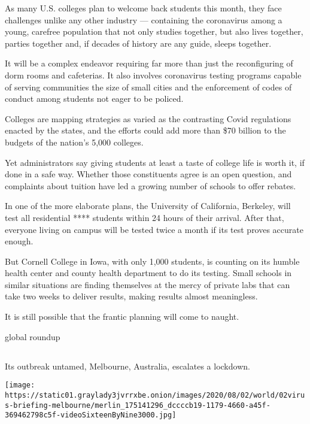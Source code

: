 As many U.S. colleges plan to welcome back students this month, they
face challenges unlike any other industry --- containing the coronavirus
among a young, carefree population that not only studies together, but
also lives together, parties together and, if decades of history are any
guide, sleeps together.

It will be a complex endeavor requiring far more than just the
reconfiguring of dorm rooms and cafeterias. It also involves coronavirus
testing programs capable of serving communities the size of small cities
and the enforcement of codes of conduct among students not eager to be
policed.

Colleges are mapping strategies as varied as the contrasting Covid
regulations enacted by the states, and the efforts could add more than
\$70 billion to the budgets of the nation's 5,000 colleges.

Yet administrators say giving students at least a taste of college life
is worth it, if done in a safe way. Whether those constituents agree is
an open question, and complaints about tuition have led a growing number
of schools to offer rebates.

In one of the more elaborate plans, the University of California,
Berkeley, will test all residential **** students within 24 hours of
their arrival. After that, everyone living on campus will be tested
twice a month if its test proves accurate enough.

But Cornell College in Iowa, with only 1,000 students, is counting on
its humble health center and county health department to do its testing.
Small schools in similar situations are finding themselves at the mercy
of private labs that can take two weeks to deliver results, making
results almost meaningless.

It is still possible that the frantic planning will come to naught.

global roundup

\hypertarget{-3}{%
\subsection{}\label{-3}}

Its outbreak untamed, Melbourne, Australia, escalates a lockdown.

\texttt{[image: https://static01.graylady3jvrrxbe.onion/images/2020/08/02/world/02virus-briefing-melbourne/merlin\_175141296\_dccccb19-1179-4660-a45f-369462798c5f-videoSixteenByNine3000.jpg]}


